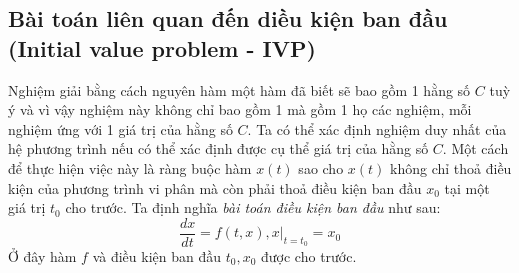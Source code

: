 \documentclass[a4paper]{article}
\begin{document}
\subsection{Bài toán liên quan đến diều kiện ban đầu (Initial value problem - IVP)}
Nghiệm giải bằng cách nguyên hàm một hàm đã biết sẽ bao gồm 1 hằng số $C$ tuỳ ý và vì vậy nghiệm này không chỉ bao gồm 1 mà gồm 1 họ các nghiệm, mỗi nghiệm ứng với 1 giá trị của hằng số $C$. Ta có thể xác định nghiệm duy nhất của hệ phương trình nếu có thể xác định được cụ thể giá trị của hằng số $C$. Một cách để thực hiện việc này là ràng buộc hàm $x(t)$ sao cho $x(t)$ không chỉ thoả điều kiện của phương trình vi phân mà còn phải thoả điều kiện ban đầu $x_0$ tại một giá trị $t_0$ cho trước. Ta định nghĩa \textit{bài toán điều kiện ban đầu} như sau:  
\begin{equation}\label{eq:init}
    \dfrac{dx}{dt} = f(t,x), x|_{t=t_0} = x_0
\end{equation} 
Ở đây hàm $f$ và điều kiện ban đầu $t_0, x_0$ được cho trước.
\end{document}
